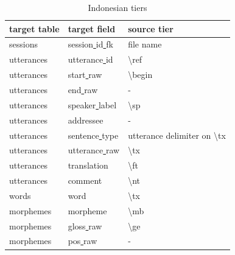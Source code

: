 \documentclass[a4paper, 11pt]{book}
\newcommand{\bks}{\textbackslash}	%
\newcommand{\und}{\underline{{ }}\hspace{0.2mm}}	%
\begin{document}
\begin{table}[ht!]
	\centering
	\begin{tabular}{lll}
		\toprule
			\textbf{target table} & \textbf{target field} & \textbf{source tier} \\
		\midrule
			sessions 	& session\und id\und fk 	& file name \\
			utterances 	& utterance\und id	& \bks ref \\
			utterances 	& start\und raw		& \bks begin \\
			utterances 	& end\und raw		& - \\
			utterances 	& speaker\und label	& \bks sp \\
			utterances 	& addressee			& - \\
			utterances 	& sentence\und type	& utterance delimiter on \bks tx \\
			utterances 	& utterance\und raw	& \bks tx \\
			utterances 	& translation		& \bks ft \\
			utterances 	& comment			& \bks nt \\

			words	 	& word		& \bks tx \\
			morphemes	& morpheme			& \bks mb \\
			morphemes	& gloss\und raw		& \bks ge \\ %
			morphemes	& pos\und raw		& - \\

		\bottomrule
	\end{tabular}
	\caption{Indonesian tiers}
	\label{tab:Indonesian tiers}
\end{table}
\end{document}
